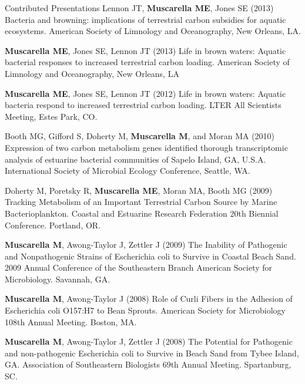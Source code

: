 \documentclass{resume} %
\begin{document}
\begin{rSection}{Contributed Presentations}
  Lennon JT, {\bf Muscarella ME}, Jones SE (2013) Bacteria and browning:
  implications of terrestrial carbon subsidies for aquatic ecosystems. American
  Society of Limnology and Oceanography, New Orleans, LA.

  {\bf Muscarella ME}, Jones SE, Lennon JT (2013) Life in brown waters: Aquatic
  bacterial responses to increased terrestrial carbon loading. American Society
  of Limnology and Oceanography, New Orleans, LA

  {\bf Muscarella ME}, Jones SE, Lennon JT (2012) Life in brown waters: Aquatic
  bacteria respond to increased terrestrial carbon loading. LTER All Scientists
  Meeting, Estes Park, CO.

  Booth MG, Gifford S, Doherty M, {\bf Muscarella M}, and Moran MA (2010)
  Expression of two carbon metabolism genes identified thorough transcriptomic
  analysis of estuarine bacterial communities of Sapelo Island, GA, U.S.A.
  International Society of Microbial Ecology Conference, Seattle, WA.

  Doherty M, Poretsky R, {\bf Muscarella ME}, Moran MA, Booth MG (2009) Tracking
  Metabolism of an Important Terrestrial Carbon Source by Marine
  Bacterioplankton. Coastal and Estuarine Research Federation 20th Biennial
  Conference. Portland, OR.

  {\bf Muscarella M}, Awong-Taylor J, Zettler J (2009) The Inability of
  Pathogenic and Nonpathogenic Strains of Escherichia coli to Survive in Coastal
  Beach Sand. 2009 Annual Conference of the Southeastern Branch American Society
  for Microbiology. Savannah, GA.

  {\bf Muscarella M}, Awong-Taylor J (2008) Role of Curli Fibers in the Adhesion
  of Escherichia coli O157:H7 to Bean Sprouts. American Society for Microbiology
  108th Annual Meeting. Boston, MA.

  {\bf Muscarella M}, Awong-Taylor J, Zettler J (2008) The Potential for
  Pathogenic and non-pathogenic Escherichia coli to Survive in Beach Sand from
  Tybee Island, GA. Association of Southeastern Biologists 69th Annual Meeting.
  Spartanburg, SC.


\end{rSection}
\end{document}

